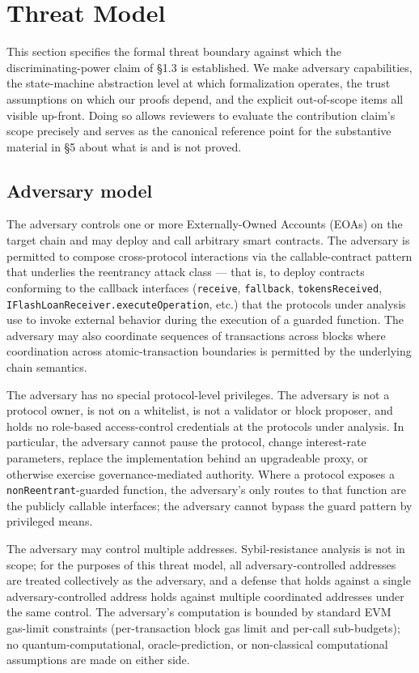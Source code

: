 \section{Threat Model}\label{threat-model}

This section specifies the formal threat boundary against which the
discriminating-power claim of §1.3 is established. We make adversary
capabilities, the state-machine abstraction level at which formalization
operates, the trust assumptions on which our proofs depend, and the
explicit out-of-scope items all visible up-front. Doing so allows
reviewers to evaluate the contribution claim's scope precisely and
serves as the canonical reference point for the substantive material in
§5 about what is and is not proved.

\subsection{Adversary model}\label{adversary-model}

The adversary controls one or more Externally-Owned Accounts (EOAs) on
the target chain and may deploy and call arbitrary smart contracts. The
adversary is permitted to compose cross-protocol interactions via the
callable-contract pattern that underlies the reentrancy attack class ---
that is, to deploy contracts conforming to the callback interfaces
(\texttt{receive}, \texttt{fallback}, \texttt{tokensReceived},
\texttt{IFlashLoanReceiver.executeOperation}, etc.) that the protocols
under analysis use to invoke external behavior during the execution of a
guarded function. The adversary may also coordinate sequences of
transactions across blocks where coordination across atomic-transaction
boundaries is permitted by the underlying chain semantics.

The adversary has no special protocol-level privileges. The adversary is
not a protocol owner, is not on a whitelist, is not a validator or block
proposer, and holds no role-based access-control credentials at the
protocols under analysis. In particular, the adversary cannot pause the
protocol, change interest-rate parameters, replace the implementation
behind an upgradeable proxy, or otherwise exercise governance-mediated
authority. Where a protocol exposes a \texttt{nonReentrant}-guarded
function, the adversary's only routes to that function are the publicly
callable interfaces; the adversary cannot bypass the guard pattern by
privileged means.

The adversary may control multiple addresses. Sybil-resistance analysis
is not in scope; for the purposes of this threat model, all
adversary-controlled addresses are treated collectively as the
adversary, and a defense that holds against a single
adversary-controlled address holds against multiple coordinated
addresses under the same control. The adversary's computation is bounded
by standard EVM gas-limit constraints (per-transaction block gas limit
and per-call sub-budgets); no quantum-computational, oracle-prediction,
or non-classical computational assumptions are made on either side.

